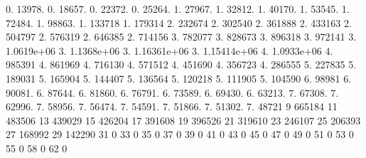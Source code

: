 0. 13978. 0. 18657. 0. 22372. 0. 25264. 1. 27967. 1. 32812. 1. 40170. 1. 53545. 1. 72484. 1. 98863. 1. 133718 1. 179314 2. 232674 2. 302540 2. 361888 2. 433163 2. 504797 2. 576319 2. 646385 2. 714156 3. 782077 3. 828673 3. 896318 3. 972141 3. 1.\+0619e+06 3. 1.\+1368e+06 3. 1.\+16361e+06 3. 1.\+15414e+06 4. 1.\+0933e+06 4. 985391 4. 861969 4. 716130 4. 571512 4. 451690 4. 356723 4. 286555 5. 227835 5. 189031 5. 165904 5. 144407 5. 136564 5. 120218 5. 111905 5. 104590 6. 98981 6. 90081. 6. 87644. 6. 81860. 6. 76791. 6. 73589. 6. 69430. 6. 63213. 7. 67308. 7. 62996. 7. 58956. 7. 56474. 7. 54591. 7. 51866. 7. 51302. 7. 48721 9 665184 11 483506 13 439029 15 426204 17 391608 19 396526 21 319610 23 246107 25 206393 27 168992 29 142290 31 0 33 0 35 0 37 0 39 0 41 0 43 0 45 0 47 0 49 0 51 0 53 0 55 0 58 0 62 0 